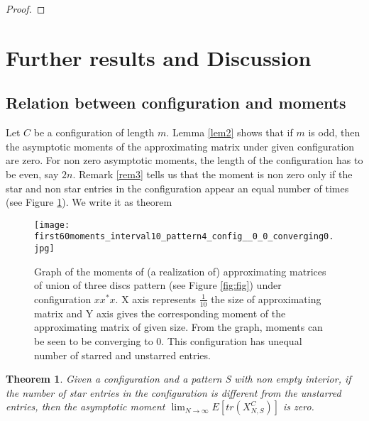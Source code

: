 \documentclass[12pt]{amsart}
\newtheorem{thm}{Theorem}[section]
\theoremstyle{definition}
\theoremstyle{remark}
\begin{document}
\begin{proof}
\end{proof}

















\section{Further results and Discussion}     \label{sec5}







\subsection{Relation between configuration and moments} \label{sec4.1}

Let $C$ be a configuration of length $m$. Lemma \ref{lem2} shows that if $m$ is odd, then the asymptotic moments of the approximating matrix under given configuration are zero. For non zero asymptotic moments, the length of the configuration has to be even, say $2n$. Remark \ref{rem3} tells us that the moment is non zero only if the star and non star entries in the configuration appear an equal number of times (see Figure \ref{fig:sfig4}). We write it as theorem



\begin{figure}
  
  \texttt{[image: first60moments\_interval10\_pattern4\_config\_\_0\_0\_converging0.jpg]}
  \caption{Graph of the moments of (a realization of) approximating matrices of union of three discs pattern (see Figure \ref{fig:fig}) under configuration $xx^*x$. X axis represents $\frac{1}{10}$ the size of approximating matrix and Y axis gives the corresponding moment of the approximating matrix of given size. From the graph, moments can be seen to be converging to 0. This configuration has unequal number of starred and unstarred entries.}
  \label{fig:sfig4}
\end{figure}



\begin{thm}
    Given a configuration and a pattern S with non empty interior, if the number of star entries in the configuration is different from the unstarred entries, then the asymptotic moment $\lim_{N \to \infty} E[tr(X_{N,S}^C)]$ is zero.  
\end{thm}
\end{document}

